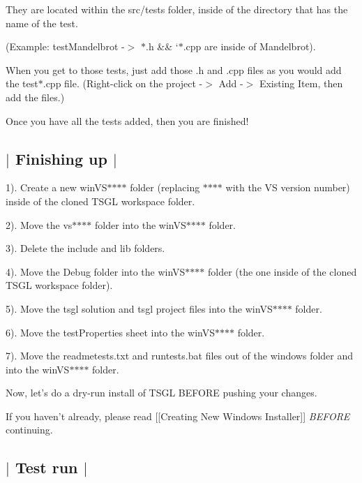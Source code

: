 They are located within the {\ttfamily src/tests} folder, inside of the directory that has the name of the test.

(Example\-: {\ttfamily test\-Mandelbrot} -\/$>$ {\ttfamily $\ast$.h} \&\& `{\ttfamily $\ast$.cpp} are inside of {\ttfamily Mandelbrot}).

When you get to those tests, just add those {\ttfamily .h} and {\ttfamily .cpp} files as you would add the {\ttfamily test$\ast$.cpp} file. ({\ttfamily Right-\/click on the project -\/$>$ Add -\/$>$ Existing Item}, then add the files.)

Once you have all the tests added, then you are finished! 

 \subsection*{$\vert$ Finishing up $\vert$ }

1). Create a new {\ttfamily win\-V\-S$\ast$$\ast$$\ast$$\ast$} folder (replacing {\ttfamily $\ast$$\ast$$\ast$$\ast$} with the V\-S version number) inside of the cloned T\-S\-G\-L workspace folder.

2). Move the {\ttfamily vs$\ast$$\ast$$\ast$$\ast$} folder into the {\ttfamily win\-V\-S$\ast$$\ast$$\ast$$\ast$} folder.

3). Delete the {\ttfamily include} and {\ttfamily lib} folders.

4). Move the {\ttfamily Debug} folder into the {\ttfamily win\-V\-S$\ast$$\ast$$\ast$$\ast$} folder (the one inside of the cloned T\-S\-G\-L workspace folder).

5). Move the {\ttfamily tsgl} solution and {\ttfamily tsgl} project files into the {\ttfamily win\-V\-S$\ast$$\ast$$\ast$$\ast$} folder.

6). Move the {\ttfamily test\-Properties} sheet into the {\ttfamily win\-V\-S$\ast$$\ast$$\ast$$\ast$} folder.

7). Move the {\ttfamily readmetests.\-txt} and {\ttfamily runtests.\-bat} files out of the {\ttfamily windows} folder and into the {\ttfamily win\-V\-S$\ast$$\ast$$\ast$$\ast$} folder.

Now, let's do a dry-\/run install of T\-S\-G\-L B\-E\-F\-O\-R\-E pushing your changes.

If you haven't already, please read \mbox{[}\mbox{[}Creating New Windows Installer\mbox{]}\mbox{]} {\itshape B\-E\-F\-O\-R\-E} continuing. 

 \subsection*{$\vert$ Test run $\vert$ }


